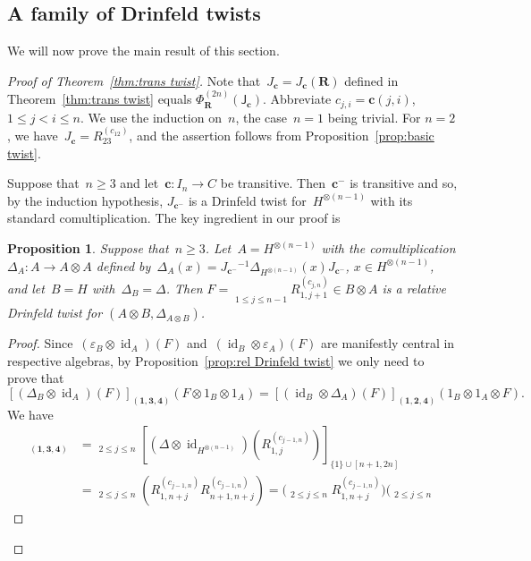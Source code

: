 \documentclass[12pt, reqno]{amsart}
\newtheorem{proposition}[theorem]{Proposition}
\theoremstyle{definition}
\newcommand{\dscprod}{\mathop{\overleftarrow{\prod}}}
\numberwithin{equation}{section}
\newcommand{\tensor}{\otimes}
\DeclareMathOperator{\id}{id}
\begin{document}
\subsection{A family of Drinfeld twists}\label{subs:fam Drinf twist}
We will now prove the main result of this section.
\begin{proof}[Proof of Theorem~\ref{thm:trans twist}]
Note that~$J_{\mathbf c}=J_{\mathbf c}(\mathbf R)$
defined in Theorem~\ref{thm:trans twist} equals
$\Phi^{(2n)}_{\mathbf  R}(\mathsf J_{\mathbf c})$.
Abbreviate $c_{j,i}=\mathbf c(j,i)$, $1\le j<i\le n$. We use the induction on~$n$, the case~$n=1$ being trivial. For $n=2$, we have~$J_{\mathbf c}=R_{23}^{(c_{12})}$, and the assertion follows from Proposition~\ref{prop:basic twist}.

Suppose that~$n\ge 3$ and let~$\mathbf c:I_n\to C$ be transitive. Then~$\mathbf c^-$
is transitive and so, 
by the induction hypothesis, $J_{\mathbf c^-}$ is a Drinfeld twist for~$H^{\tensor(n-1)}$ with its standard comultiplication.
The key ingredient in our proof is
\begin{proposition}\label{prop:key proposition}
Suppose that~$n\ge 3$. Let~$A=H^{\tensor (n-1)}$ with the comultiplication
$\Delta_A:A\to A\tensor A$ defined by~$\Delta_A(x)=J_{\mathbf c^-}{}^{-1}\Delta_{H^{\tensor(n-1)}}(x)J_{\mathbf c^-}$, $x\in H^{\tensor(n-1)}$, and let~$B=H$ with~$\Delta_B=\Delta$. Then
$F=\dscprod\limits_{1\le j\le n-1} R_{1,j+1}^{(c_{j,n})}\in B\tensor A$
is a relative Drinfeld twist for $(A\tensor B,\Delta_{A\tensor B})$.
\end{proposition}
\begin{proof}
Since~$(\varepsilon_B\tensor\id_A)(F)$ and~$(\id_B\tensor\varepsilon_A)(F)$ are manifestly central in respective algebras, 
by Proposition~\ref{prop:rel Drinfeld twist} we only need to prove that 
\begin{equation}\label{eq:rel twist to prove}
[(\Delta_B\tensor\id_A)(F)]_{(\mathbf 1,\mathbf 3,\mathbf 4)}(F\tensor 1_B\tensor 1_A)
=[(\id_B\tensor \Delta_A)(F)]_{(\mathbf 1,\mathbf 2,\mathbf 4)}(1_B\tensor 1_A\tensor F).
\end{equation}
We have
\begin{align}
[(\Delta_B\tensor\id_A)(F)]_{(\mathbf 1,\mathbf 3,\mathbf 4)}&=\dscprod_{2\le j\le n}
[(\Delta\tensor\id_{H^{\tensor (n-1)}})(R_{1,j}^{(c_{j-1,n})})]_{\{1\}\cup[n+1,2n]}\nonumber\\
&=\dscprod_{2\le j\le n}
(R_{1,n+j}^{(c_{j-1,n})}R_{n+1,n+j}^{(c_{j-1,n})})=\Big(\dscprod_{2\le j\le n}
R_{1,n+j}^{(c_{j-1,n})}\Big)\Big(\dscprod_{2\le j\le n}

\end{align}
\end{proof}
\end{proof}
\end{document}
